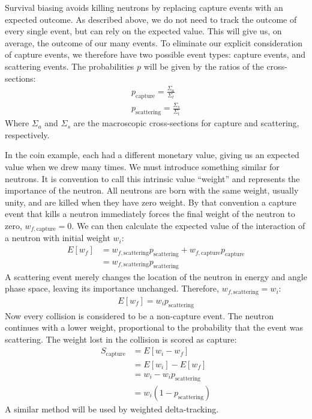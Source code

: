 Survival biasing avoids killing neutrons by replacing capture
events with an expected outcome. As described above, we do not need to
track the outcome of every single event, but can rely on the expected
value. This will give us, on average, the outcome of our many
events. To eliminate our explicit consideration of capture events,
we therefore have two possible event types: capture events, and
scattering events. The probabilities $p$ will be given by the
ratios of the cross-sections:
\begin{align*}
  p_{\mathrm{capture}} = \frac{\Sigma_{a}}{\Sigma_t} \\
  p_{\mathrm{scattering}} = \frac{\Sigma_{s}}{\Sigma_t}
\end{align*}
Where $\Sigma_{a}$ and $\Sigma_{s}$ are the macroscopic cross-sections
for capture  and scattering, respectively.

In the coin example, each had a different monetary value, giving us an
expected value when we drew many times. We must introduce something
similar for neutrons. It is convention to call this intrinsic value
``weight'' and represents the importance of the neutron. All neutrons
are born with the same weight, usually unity, and are killed when they
have zero weight. By that convention a capture event that kills a
neutron immediately forces the final weight of the neutron to zero,
$w_{f,\mathrm{capture}} = 0$. We can then calculate the expected
value of the interaction of a neutron with initial weight $w_i$:
\begin{align*}
  E[w_f] &= w_{f,\mathrm{scattering}}p_\mathrm{scattering} +
           w_{f,\mathrm{capture}}p_\mathrm{capture} \\
  &= w_{f,\mathrm{scattering}}p_\mathrm{scattering}
\end{align*}
A scattering event merely changes the location of the neutron in
energy and angle phase space, leaving its importance
unchanged. Therefore, $w_{f,\mathrm{scattering}} = w_i$:
\begin{align*}
  E[w_f] = w_ip_\mathrm{scattering} 
\end{align*}
Now every collision is considered to be a non-capture event. The
neutron continues with a lower weight, proportional to the probability
that the event was scattering. The weight lost in the collision is
scored as capture:
\begin{align*}
  S_\mathrm{capture} &= E[w_i - w_f] \\
  &= E[w_i] - E[w_f] \\
&= w_i - w_ip_\mathrm{scattering} \\
&= w_i(1-p_\mathrm{scattering})
\end{align*}
A similar method will be used by weighted delta-tracking.

